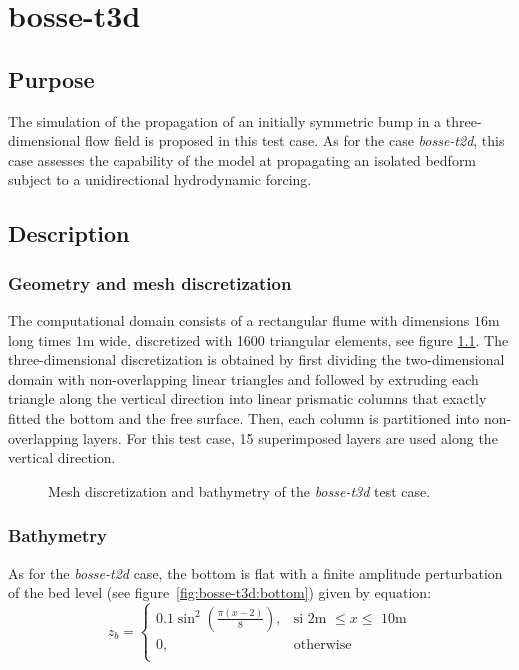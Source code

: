 \chapter{bosse-t3d}
%

%
\section{Purpose}
The simulation of the propagation of an initially symmetric bump in a three-dimensional flow field is proposed in this test case.
As for the case \textit{bosse-t2d}, this case assesses the capability of the model at propagating an isolated bedform subject to a unidirectional hydrodynamic forcing.

\section{Description}

\subsection{Geometry and mesh discretization}
%
The computational domain consists of a rectangular flume with dimensions $16$m long times $1$m wide, discretized with 1600 triangular elements, see figure \ref{fig:bosse-t3d:mesh}. The three-dimensional discretization is obtained by first dividing the two-dimensional domain with non-overlapping linear triangles and followed by extruding each triangle along the
vertical direction into linear prismatic columns that exactly fitted the bottom and the free surface. Then, each column
is partitioned into non-overlapping layers. For this test case, 15 superimposed layers are used along the vertical direction.

\begin{figure}[H]
 \centering
 \caption{Mesh discretization and bathymetry of the \textit{bosse-t3d} test case.}
 \label{fig:bosse-t3d:mesh}
\end{figure}
%
\subsection{Bathymetry}
%
As for the \textit{bosse-t2d} case, the bottom is flat with a finite amplitude perturbation of the bed level (see figure~\ref{fig:bosse-t3d:bottom}) given by equation:
\begin {equation}
z_b=\left\{
\begin{array}{ll}
\displaystyle
0.1\sin^2\left(\frac{\pi (x-2)}{8}\right), & \text{si 2m $\leq x \leq$ 10m}  \\
\displaystyle
 0, & \text{otherwise} \label{eq:topographie_initiale} \\
\end{array}
\right.
\end{equation}

